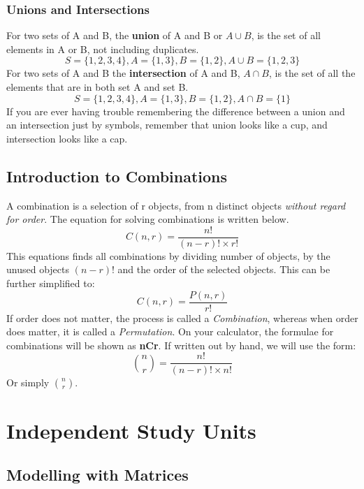 \documentclass[final,1p,12pt]{elsarticle}
\begin{document}
    \subsubsection{Unions and Intersections}
    For two sets of A and B, the \textbf{union} of A and B or $A\cup B$, is the set of all elements in A or B, not including duplicates.
    \[S = \{1,2,3,4\}, A = \{1,3\}, B =\{1,2\}, A\cup B=\{1,2,3\}\]
    For two sets of A and B the \textbf{intersection} of A and B, $A\cap B$, is the set of all the elements that are in both set A and set B.
    \[S = \{1,2,3,4\}, A = \{1,3\}, B =\{1,2\}, A\cap B=\{1\}\]
    If you are ever having trouble remembering the difference between a union and an intersection just by symbols, remember that union looks like a cup, and intersection looks like a cap.
    
    \subsection{Introduction to Combinations}
    A combination is a selection of r objects, from n distinct objects \emph{without regard for order}. The equation for solving combinations is written below.
    \[C(n,r) = \frac{n!}{(n-r)!\times r!}\]
    This equations finds all combinations by dividing number of objects, by the unused objects $(n-r)!$ and the order of the selected objects. This can be further simplified to:
    \[C(n,r) = \frac{P(n,r)}{r!}\]
    If order does not matter, the process is called a \emph{Combination}, whereas when order does matter, it is called a \emph{Permutation}. On your calculator, the formulae for combinations will be shown as \textbf{nCr}. If written out by hand, we will use the form:
    \[
        \binom{n}{r} = \frac{n!}{(n-r)!\times n!}
    \]
    Or simply \(\binom{n}{r}\).

\section{Independent Study Units}

    \subsection{Modelling with Matrices}
    
\end{document}

